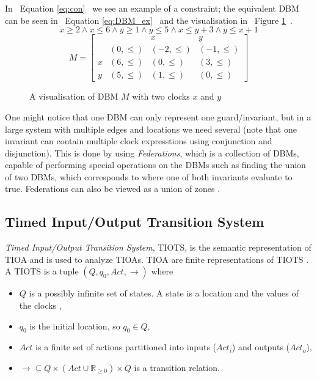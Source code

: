 In ~Equation \ref{eq:con}~ we see an example of a constraint; the equivalent DBM can be seen in ~Equation \ref{eq:DBM_ex}~ and the visualisation in ~Figure \ref{fig:DBM_ex}~.
\begin{equation}\label{eq:con}
    x \geq 2 \wedge x \leq 6 \wedge y \geq 1 \wedge y \leq 5 \wedge x \leq y + 3 \wedge y \leq x + 1
\end{equation}
\begin{equation}\label{eq:DBM_ex}
    M = 
    \begin{bmatrix}
                 &&    x    &    y\\
          & (0, \leq) & (-2, \leq) & (-1, \leq)\\
        x & (6, \leq) & (0, \leq) & (3, \leq)\\
        y & (5, \leq) & (1, \leq) & (0, \leq) 
    \end{bmatrix}
\end{equation}

\begin{figure}[H]
    \centering
    \caption{A visualisation of DBM $M$ with two clocks $x$ and $y$}
    \label{fig:DBM_ex}
\end{figure}

One might notice that one DBM can only represent one guard/invariant, but in a large system with multiple edges and locations we need several (note that one invariant can contain multiple clock expresstions using conjunction and disjunction). This is done by using \emph{Federations}, which is a collection of DBMs, capable of performing special operations on the DBMs such as finding the union of two DBMs, which corresponds to where one of both invariants evaluate to true. Federations can also be viewed as a union of zones \cite{ecdartheory, Rokicki_DBM}.

\subsection{Timed Input/Output Transition System}\label{sec:TIOTS}

\emph{Timed Input/Output Transition System}, TIOTS, is the semantic representation of TIOA and is used to analyze TIOAs. TIOA are finite representations of TIOTS \cite{ecdartheory}. A TIOTS is a tuple \cite{ecdartheory}  $(Q, q_{0}, Act, \rightarrow)$ where

\begin{itemize}
    \item $Q$ is a possibly infinite set of states. A state is a location and the values of the clocks \cite{martijn},
    \item $q_{0}$ is the initial location, so $q_{0} \in Q$,
    \item $Act$ is a finite set of actions partitioned into inputs ($Act_{i}$) and outputs ($Act_{o}$),
    \item $\rightarrow \subseteq Q \times (Act \cup \mathbb{R}_{\geq 0}) \times Q$ is a transition relation.
\end{itemize}

